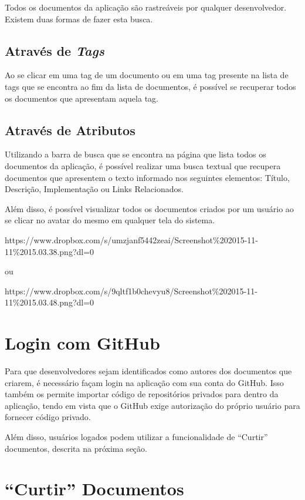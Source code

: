 Todos os documentos da aplicação são rastreáveis por qualquer desenvolvedor. Existem duas formas de fazer esta busca.

\subsection{Através de \textit{Tags}}

Ao se clicar em uma tag de um documento ou em uma tag presente na lista de tags que se encontra ao fim da lista de documentos, é possível se recuperar todos os documentos que apresentam aquela tag.

\subsection{Através de Atributos}

Utilizando a barra de busca que se encontra na página que lista todos os documentos da aplicação, é possível realizar uma busca textual que recupera documentos que apresentem o texto informado nos seguintes elementos: Título, Descrição, Implementação ou Links Relacionados.

Além disso, é possível visualizar todos os documentos criados por um usuário ao se clicar no avatar do mesmo em qualquer tela do sistema.

https://www.dropbox.com/s/umzjanf5442zeai/Screenshot\%202015-11-11\%2015.03.38.png?dl=0

ou

https://www.dropbox.com/s/9qltf1b0chevyu8/Screenshot\%202015-11-11\%2015.03.48.png?dl=0

\section{Login com GitHub}

Para que desenvolvedores sejam identificados como autores dos documentos que criarem, é necessário façam login na aplicação com sua conta do GitHub. Isso também os permite importar código de repositórios privados para dentro da aplicação, tendo em vista que o GitHub exige autorização do próprio usuário para fornecer código privado.

Além disso, usuários logados podem utilizar a funcionalidade de ``Curtir'' documentos, descrita na próxima seção.

\section{``Curtir'' Documentos}

